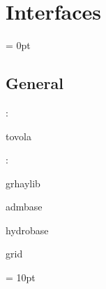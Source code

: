 
\section{Interfaces} 


\parskip = 0pt

\vspace{3mm} \subsection*{General}

: 

tovola
\vspace{2mm}

: 

grhaylib

admbase

hydrobase

grid
\vspace{2mm}

\vspace{5mm}\parskip = 10pt 
